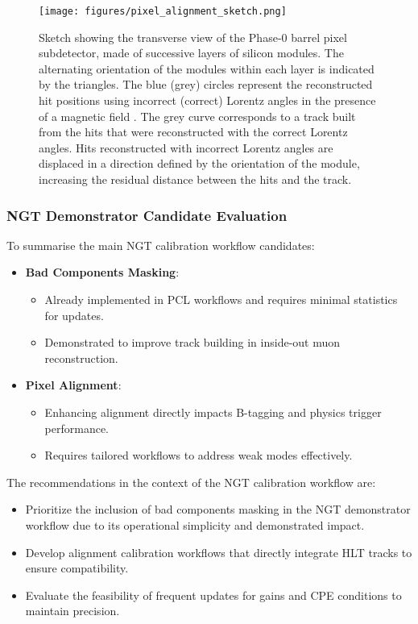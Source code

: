 \begin{figure}[htbp]
   \centering
	\texttt{[image: figures/pixel\_alignment\_sketch.png]}
   \caption{Sketch showing the transverse view of the Phase-0 barrel pixel subdetector, made of successive layers of silicon modules. The alternating orientation of the modules within each layer is indicated by the triangles. The blue (grey) circles represent the reconstructed hit positions using incorrect (correct) Lorentz angles in the presence of a magnetic field . The grey curve corresponds to a track built from the hits that were reconstructed with the correct Lorentz angles. Hits reconstructed with incorrect Lorentz angles are displaced in a direction defined by the orientation of the module, increasing the residual distance between the hits and the track. \cite{CMS:2022ali}}
   \label{fig:pixelAlignment}
\end{figure}

\subsubsection{NGT Demonstrator Candidate Evaluation}

To summarise the main NGT calibration workflow candidates:
\begin{itemize}
    \item \textbf{Bad Components Masking}:
    \begin{itemize}
        \item Already implemented in PCL workflows and requires minimal statistics for updates.
        \item Demonstrated to improve track building in inside-out muon reconstruction.
    \end{itemize}
    \item \textbf{Pixel Alignment}:
    \begin{itemize}
        \item Enhancing alignment directly impacts B-tagging and physics trigger performance.
        \item Requires tailored workflows to address weak modes effectively.
    \end{itemize}
\end{itemize}

The recommendations in the context of the NGT calibration workflow are:
\begin{itemize}
    \item Prioritize the inclusion of bad components masking in the NGT demonstrator workflow due to its operational simplicity and demonstrated impact.
    \item Develop alignment calibration workflows that directly integrate HLT tracks to ensure compatibility.
    \item Evaluate the feasibility of frequent updates for gains and CPE conditions to maintain precision.
\end{itemize}
